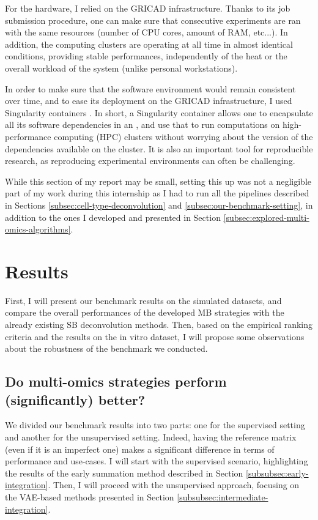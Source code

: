 \documentclass{article}
\begin{document}
For the hardware, I relied on the GRICAD infrastructure.
Thanks to its job submission procedure, one can make sure that consecutive experiments are ran with the same resources (number of CPU cores, amount of RAM, etc...).
In addition, the computing clusters are operating at all time in almost identical conditions, providing stable performances, independently of the heat or the overall workload of the system (unlike personal workstations).

In order to make sure that the software environment would remain consistent over time, and to ease its deployment on the GRICAD infrastructure, I used Singularity containers \cite{singularity}.
In short, a Singularity container allows one to encapsulate all its software dependencies in an , and use that  to run computations on high-performance computing (HPC) clusters without worrying about the version of the dependencies available on the cluster.
It is also an important tool for reproducible research, as reproducing experimental environments can often be challenging.

While this section of my report may be small, setting this up was not a negligible part of my work during this internship as I had to run all the pipelines described in Sections \ref{subsec:cell-type-deconvolution} and \ref{subsec:our-benchmark-setting}, in addition to the ones I developed and presented in Section \ref{subsec:explored-multi-omics-algorithms}.

\section{Results}\label{sec:results}

First, I will present our benchmark results on the simulated datasets, and compare the overall performances of the developed MB strategies with the already existing SB deconvolution methods.
Then, based on the empirical ranking criteria and the results on the in vitro dataset, I will propose some observations about the robustness of the benchmark we conducted.

\subsection{Do multi-omics strategies perform (significantly) better?}\label{subsec:do-multi-omics-strategies-perform-better?}

We divided our benchmark results into two parts: one for the supervised setting and another for the unsupervised setting.
Indeed, having the reference matrix (even if it is an imperfect one) makes a significant difference in terms of performance and use-cases.
I will start with the supervised scenario, highlighting the results of the early summation method described in Section \ref{subsubsec:early-integration}. 
Then, I will proceed with the unsupervised approach, focusing on the VAE-based methods presented in Section \ref{subsubsec:intermediate-integration}.
\end{document}
